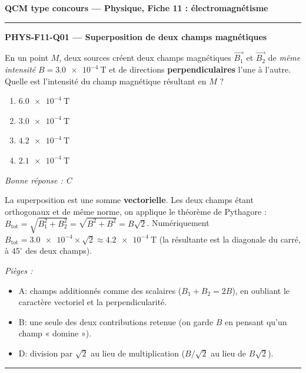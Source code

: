 \documentclass[11pt,a4paper]{article}
\newcommand{\vv}[1]{\vec{#1}}\newcommand{\ds}{\displaystyle}
\begin{document}
\begin{center}\Large\bfseries QCM type concours --- Physique, Fiche 11 : électromagnétisme\end{center}
\vspace{4pt}\hrule\vspace{10pt}

\noindent\textbf{PHYS-F11-Q01 --- Superposition de deux champs magnétiques}\par
En un point $M$, deux sources créent deux champs magnétiques $\vv{B_1}$ et $\vv{B_2}$ de \emph{même intensité} $B=\qty{3.0e-4}{\tesla}$ et de directions \textbf{perpendiculaires} l'une à l'autre. Quelle est l'intensité du champ magnétique résultant en $M$ ?
\begin{center}
\end{center}
\begin{enumerate}[label=\Alph*)]
\item $\qty{6.0e-4}{\tesla}$
\item $\qty{3.0e-4}{\tesla}$
\item $\qty{4.2e-4}{\tesla}$
\item $\qty{2.1e-4}{\tesla}$
\end{enumerate}
\textit{Bonne réponse : C}\par
La superposition est une somme \textbf{vectorielle}. Les deux champs étant orthogonaux et de même norme, on applique le théorème de Pythagore : $B_{\text{tot}}=\sqrt{B_1^{2}+B_2^{2}}=\sqrt{B^{2}+B^{2}}=B\sqrt{2}$. Numériquement $B_{\text{tot}}=\num{3.0e-4}\times\sqrt{2}\approx\qty{4.2e-4}{\tesla}$ (la résultante est la diagonale du carré, à $45^\circ$ des deux champs).\par
\textit{Pièges :}
\begin{itemize}
\item A: champs additionnés comme des scalaires ($B_1+B_2=2B$), en oubliant le caractère vectoriel et la perpendicularité.
\item B: une seule des deux contributions retenue (on garde $B$ en pensant qu'un champ « domine »).
\item D: division par $\sqrt{2}$ au lieu de multiplication ($B/\sqrt{2}$ au lieu de $B\sqrt{2}$).
\end{itemize}
\vspace{8pt}\hrule\vspace{8pt}
\end{document}
